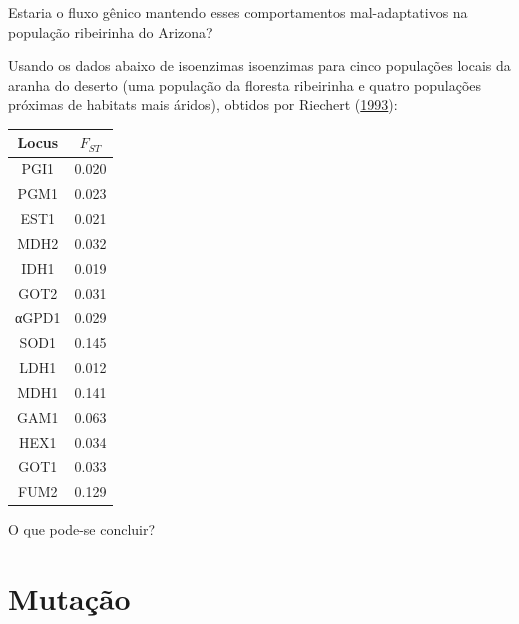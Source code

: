 \documentclass[
]{book}
\begin{document}
Estaria o fluxo gênico mantendo esses comportamentos mal-adaptativos na população ribeirinha do Arizona?

Usando os dados abaixo de isoenzimas isoenzimas para cinco populações locais da aranha do deserto (uma população da floresta ribeirinha e quatro populações próximas de habitats mais áridos), obtidos por Riechert (\href{https://doi.org/10.1007/BF00183792}{1993}):

\begin{longtable}[]{@{}cc@{}}
\toprule()
Locus & \(F_{ST}\) \\
\midrule()
\endhead
PGI1 & 0.020 \\
PGM1 & 0.023 \\
EST1 & 0.021 \\
MDH2 & 0.032 \\
IDH1 & 0.019 \\
GOT2 & 0.031 \\
αGPD1 & 0.029 \\
SOD1 & 0.145 \\
LDH1 & 0.012 \\
MDH1 & 0.141 \\
GAM1 & 0.063 \\
HEX1 & 0.034 \\
GOT1 & 0.033 \\
FUM2 & 0.129 \\
\bottomrule()
\end{longtable}

O que pode-se concluir?

\hypertarget{mutauxe7uxe3o}{%
\chapter{Mutação}\label{mutauxe7uxe3o}}
\end{document}
